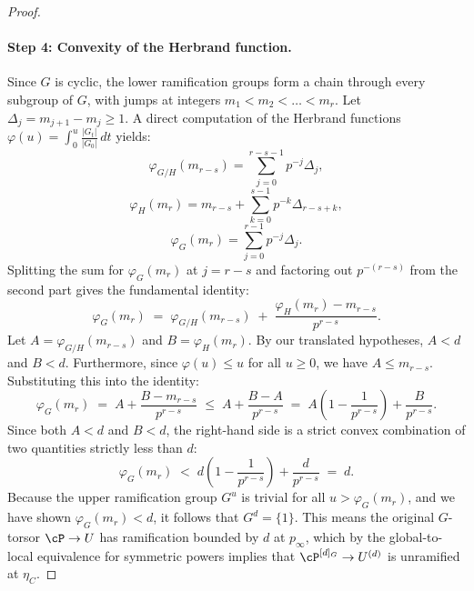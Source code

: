 \begin{proof}
\paragraph{Step 4: Convexity of the Herbrand function.}
Since $G$ is cyclic, the lower ramification groups form a chain through every subgroup of $G$, with jumps at integers $m_1 < m_2 < \dots < m_r$. Let $\Delta_j = m_{j+1} - m_j \geq 1$. A direct computation of the Herbrand functions $\varphi(u) = \int_0^u \frac{|G_t|}{|G_0|}\,dt$ yields:
\[
\varphi_{G/H}(m_{r-s}) = \sum_{j=0}^{r-s-1} p^{-j}\Delta_j,
\]
\[
\varphi_H(m_r) = m_{r-s} + \sum_{k=0}^{s-1} p^{-k}\Delta_{r-s+k},
\]
\[
\varphi_G(m_r) = \sum_{j=0}^{r-1} p^{-j}\Delta_j.
\]
Splitting the sum for $\varphi_G(m_r)$ at $j = r-s$ and factoring out $p^{-(r-s)}$ from the second part gives the fundamental identity:
\[
\varphi_G(m_r) \;=\; \varphi_{G/H}(m_{r-s}) \;+\; \frac{\varphi_H(m_r) - m_{r-s}}{p^{r-s}}.
\]
Let $A = \varphi_{G/H}(m_{r-s})$ and $B = \varphi_H(m_r)$. By our translated hypotheses, $A < d$ and $B < d$. Furthermore, since $\varphi(u) \leq u$ for all $u \geq 0$, we have $A \leq m_{r-s}$. Substituting this into the identity:
\[
\varphi_G(m_r) \;=\; A + \frac{B - m_{r-s}}{p^{r-s}} \;\leq\; A + \frac{B - A}{p^{r-s}} \;=\; A\left(1 - \frac{1}{p^{r-s}}\right) + \frac{B}{p^{r-s}}.
\]
Since both $A < d$ and $B < d$, the right-hand side is a strict convex combination of two quantities strictly less than $d$:
\[
\varphi_G(m_r) \;<\; d\left(1 - \frac{1}{p^{r-s}}\right) + \frac{d}{p^{r-s}} \;=\; d.
\]
Because the upper ramification group $G^u$ is trivial for all $u > \varphi_G(m_r)$, and we have shown $\varphi_G(m_r) < d$, it follows that $G^d = \{1\}$. This means the original $G$-torsor $\cP \to U$ has ramification bounded by $d$ at $p_\infty$, which by the global-to-local equivalence for symmetric powers implies that $\cP^{[d]_G} \to U^{(d)}$ is unramified at $\eta_C$.
\end{proof}